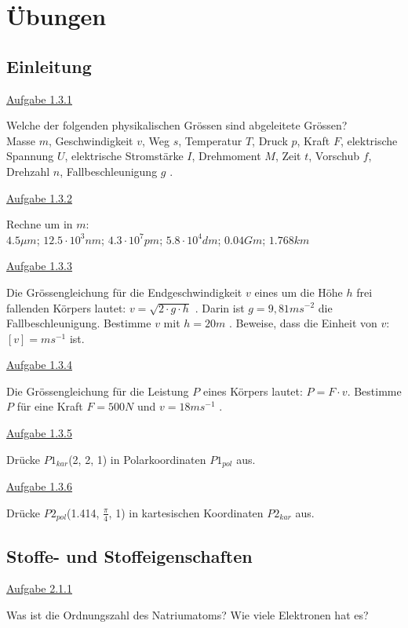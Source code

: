 \chapter{Übungen}\label{app:A_Übungen}

\section{Einleitung}

\underline{Aufgabe 1.3.1}

Welche der folgenden physikalischen Grössen sind abgeleitete Grössen? \\
Masse $m$, Geschwindigkeit $v$, Weg $s$, Temperatur $T$, Druck $p$, Kraft $F$, elektrische Spannung $U$,
elektrische Stromstärke $I$, Drehmoment $M$, Zeit $t$, Vorschub $f$, Drehzahl $n$, Fallbeschleunigung $g$ \cite{boge_physik_2008}.

\underline{Aufgabe 1.3.2}

Rechne um in $m$: \\
$4.5 \mu m$; $12.5 \cdot 10^3 nm$; $4.3 \cdot 10^7 pm$; 
$5.8 \cdot 10^4 dm$; $0.04 Gm$; $1.768km$ \cite{boge_physik_2008}

\underline{Aufgabe 1.3.3}

Die Grössengleichung für die Endgeschwindigkeit $v$ eines um die Höhe $h$ frei fallenden Körpers
lautet: $v = \sqrt{2 \cdot g \cdot h}$ . Darin ist $g = 9,81 m s^{-2}$ die Fallbeschleunigung.
Bestimme $v$ mit $h = 20 m$ \cite{boge_physik_2008}. Beweise, dass die Einheit von $v$: $[v] = m s^{-1}$ ist.

\underline{Aufgabe 1.3.4}

Die Grössengleichung für die Leistung $P$ eines Körpers lautet: $P = F \cdot v$.
Bestimme $P$ für eine Kraft $F = 500 N$ und $v = 18 m s^{-1}$ \cite{boge_physik_2008}.

\underline{Aufgabe 1.3.5}

Drücke $P1_{kar}$(2, 2, 1) in Polarkoordinaten $P1_{pol}$ aus.

\underline{Aufgabe 1.3.6}

Drücke $P2_{pol}$(1.414, $\frac{\pi}{4}$, 1) in kartesischen Koordinaten $P2_{kar}$ aus.

\section{Stoffe- und Stoffeigenschaften}

\underline{Aufgabe 2.1.1}

Was ist die Ordnungszahl des Natriumatoms? Wie viele Elektronen hat es?

